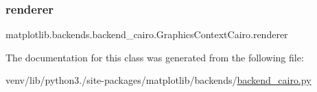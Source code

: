 \subsubsection{\texorpdfstring{renderer}{renderer}}
{\footnotesize\ttfamily matplotlib.\+backends.\+backend\+\_\+cairo.\+Graphics\+Context\+Cairo.\+renderer}



The documentation for this class was generated from the following file\+:\begin{DoxyCompactItemize}
\item 
venv/lib/python3./site-\/packages/matplotlib/backends/\hyperlink{backend__cairo_8py}{backend\+\_\+cairo.\+py}\end{DoxyCompactItemize}
